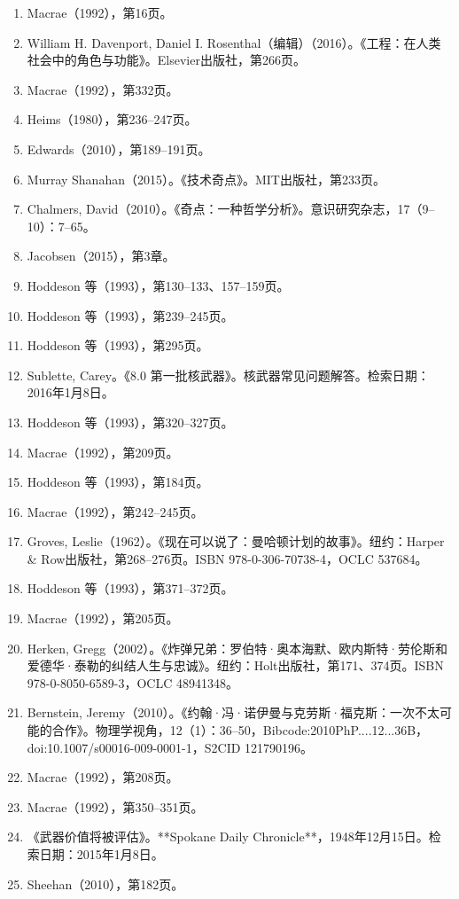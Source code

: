 \begin{enumerate}
\item Macrae（1992），第16页。  
\item William H. Davenport, Daniel I. Rosenthal（编辑）（2016）。《工程：在人类社会中的角色与功能》。Elsevier出版社，第266页。
\item Macrae（1992），第332页。  
\item Heims（1980），第236–247页。  
\item Edwards（2010），第189–191页。  
\item Murray Shanahan（2015）。《技术奇点》。MIT出版社，第233页。  
\item Chalmers, David（2010）。《奇点：一种哲学分析》。意识研究杂志，17（9–10）：7–65。  
\item Jacobsen（2015），第3章。  
\item Hoddeson 等（1993），第130–133、157–159页。  
\item Hoddeson 等（1993），第239–245页。  
\item Hoddeson 等（1993），第295页。  
\item Sublette, Carey。《8.0 第一批核武器》。核武器常见问题解答。检索日期：2016年1月8日。  
\item Hoddeson 等（1993），第320–327页。  
\item Macrae（1992），第209页。  
\item Hoddeson 等（1993），第184页。  
\item Macrae（1992），第242–245页。  
\item Groves, Leslie（1962）。《现在可以说了：曼哈顿计划的故事》。纽约：Harper & Row出版社，第268–276页。ISBN 978-0-306-70738-4，OCLC 537684。  
\item Hoddeson 等（1993），第371–372页。  
\item Macrae（1992），第205页。  
\item Herken, Gregg（2002）。《炸弹兄弟：罗伯特·奥本海默、欧内斯特·劳伦斯和爱德华·泰勒的纠结人生与忠诚》。纽约：Holt出版社，第171、374页。ISBN 978-0-8050-6589-3，OCLC 48941348。
\item Bernstein, Jeremy（2010）。《约翰·冯·诺伊曼与克劳斯·福克斯：一次不太可能的合作》。物理学视角，12（1）：36–50，Bibcode:2010PhP....12...36B，doi:10.1007/s00016-009-0001-1，S2CID 121790196。  
\item Macrae（1992），第208页。  
\item Macrae（1992），第350–351页。  
\item 《武器价值将被评估》。**Spokane Daily Chronicle**，1948年12月15日。检索日期：2015年1月8日。  
\item Sheehan（2010），第182页。  

\end{enumerate}
